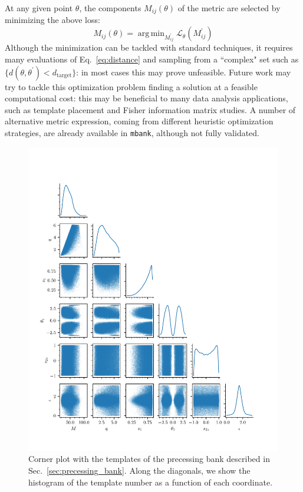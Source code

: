 \documentclass[twocolumn,showpacs,preprintnumbers,nofootinbib,prd,
superscriptaddress,10pt]{revtex4-2}
\DeclareMathOperator*{\argmin}{arg\,min}
\begin{document}
At any given point $\theta$, the components $M_{ij}(\theta)$ of the metric are selected by minimizing the above loss:
\begin{equation} \label{eq:metric_optmization}
	M_{ij}(\theta) = \argmin_{M^\prime_{ij}}  \mathcal{L}_\theta(M^\prime_{ij})
\end{equation}
Although the minimization can be tackled with standard techniques, it requires many evaluations of Eq.~\eqref{eq:distance} and sampling from a ``complex" set such as ${\{d(\theta,\theta^\prime) < d_\mathrm{target}\}}$: in most cases this may prove unfeasible.
Future work may try to tackle this optimization problem finding a solution at a feasible computational cost: this may be beneficial to many data analysis applications, such as template placement and Fisher information matrix studies.
A number of alternative metric expression, coming from different heuristic optimization strategies, are already available in \texttt{mbank}, although not fully validated.


\begin{figure}
	\centering
	\includegraphics[scale = 1.]{corner_precessing}
	\caption{Corner plot with the templates of the precessing bank described in Sec.~\ref{sec:precessing_bank}. Along the diagonals, we show the histogram of the template number as a function of each coordinate.}
	\label{fig:corner_precessing}
\end{figure}
\end{document}
